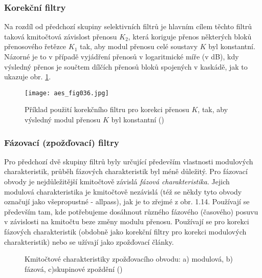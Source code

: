         \subsubsection{Korekční filtry}
          Na rozdíl od předchozí skupiny selektivních filtrů je hlavním cílem těchto filtrů taková
          kmitočtová závislost přenosu \(K_2\), která koriguje přenos některých bloků přenosového
          řetězce \(K_1\) tak, aby modul přenosu celé soustavy \(K\) byl konstantní. Názorné je to v
          případě vyjádření přenosů v logaritmické míře (v dB), kdy výsledný přenos je součtem
          dílčích přenosů bloků spojených v kaskádě, jak to ukazuje obr. \ref{aes:fig036}. 

          \begin{figure}[ht!]  %
            \centering
            \texttt{[image: aes\_fig036.jpg]}
            \caption{Příklad použití korekčního filtru pro korekci přenosu \(K\), tak, aby výsledný
                    modul přenosu \(K\) byl konstantní (\cite[s.~36]{HajekSedlacek2002})}
            \label{aes:fig036}    
          \end{figure}

        \subsubsection{Fázovací (zpožďovací) filtry}
          Pro předchozí dvě skupiny filtrů byly určující především vlastnosti modulových
          charakteristik, průběh fázových charakteristik byl méně důležitý. Pro fázovací obvody je
          nejdůležitější kmitočtově závislá \emph{fázová charakteristika}. Jejich modulová
          charakteristika je kmitočtově nezávislá (též se někdy tyto obvody označují jako
          všepropustné - allpass), jak je to zřejmé z obr. 1.14. Používají se především tam, kde
          potřebujeme dosáhnout různého fázového (časového) posuvu v závislosti na kmitočtu beze
          změny modulu přenosu. Používají se pro korekci fázových charakteristik (obdobně jako
          korekční filtry pro korekci modulových charakteristik) nebo se užívají jako zpožďovací
          články. 

          \begin{figure}[ht!]
            \centering  
            \caption{Kmitočtové charakteristiky zpožďovacího obvodu: a) modulová, b) fázová,
                    c)skupinové zpoždění
                    (\cite[s.~36]{HajekSedlacek2002})}
                    \label{aes:fig037}
          \end{figure}

